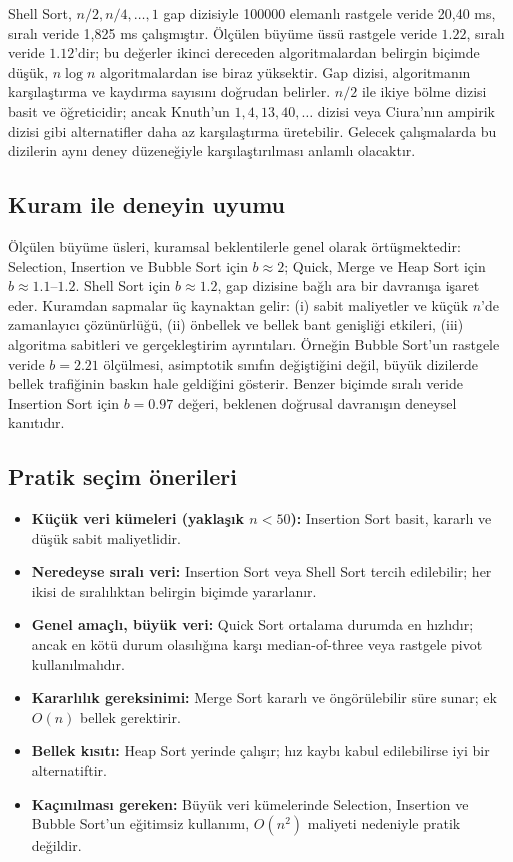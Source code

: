 \documentclass[12pt,a4paper]{article}
\begin{document}
Shell Sort, $n/2, n/4, \dots, 1$ gap dizisiyle 100000 elemanlı rastgele veride
20,40 ms, sıralı veride 1,825 ms çalışmıştır. Ölçülen büyüme üssü rastgele veride
$1.22$, sıralı veride $1.12$'dir; bu değerler ikinci dereceden
algoritmalardan belirgin biçimde düşük, $n \log n$ algoritmalardan ise biraz
yüksektir. Gap dizisi, algoritmanın karşılaştırma ve kaydırma sayısını doğrudan
belirler. $n/2$ ile ikiye bölme dizisi basit ve öğreticidir; ancak Knuth'un
$1, 4, 13, 40, \dots$ dizisi veya Ciura'nın ampirik dizisi gibi alternatifler
daha az karşılaştırma üretebilir. Gelecek çalışmalarda bu dizilerin aynı deney
düzeneğiyle karşılaştırılması anlamlı olacaktır.

\subsection{Kuram ile deneyin uyumu}

Ölçülen büyüme üsleri, kuramsal beklentilerle genel olarak örtüşmektedir:
Selection, Insertion ve Bubble Sort için $b \approx 2$; Quick, Merge ve Heap
Sort için $b \approx 1.1$--$1.2$. Shell Sort için $b \approx 1.2$, gap
dizisine bağlı ara bir davranışa işaret eder. Kuramdan sapmalar üç kaynaktan
gelir: (i) sabit maliyetler ve küçük $n$'de zamanlayıcı çözünürlüğü, (ii)
önbellek ve bellek bant genişliği etkileri, (iii) algoritma sabitleri ve
gerçekleştirim ayrıntıları. Örneğin Bubble Sort'un rastgele veride $b = 2.21$
ölçülmesi, asimptotik sınıfın değiştiğini değil, büyük dizilerde bellek
trafiğinin baskın hale geldiğini gösterir. Benzer biçimde sıralı veride Insertion
Sort için $b = 0.97$ değeri, beklenen doğrusal davranışın deneysel kanıtıdır.

\subsection{Pratik seçim önerileri}

\begin{itemize}
  \item \textbf{Küçük veri kümeleri (yaklaşık $n < 50$):} Insertion Sort basit,
        kararlı ve düşük sabit maliyetlidir.
  \item \textbf{Neredeyse sıralı veri:} Insertion Sort veya Shell Sort tercih
        edilebilir; her ikisi de sıralılıktan belirgin biçimde yararlanır.
  \item \textbf{Genel amaçlı, büyük veri:} Quick Sort ortalama durumda en
        hızlıdır; ancak en kötü durum olasılığına karşı median-of-three veya
        rastgele pivot kullanılmalıdır.
  \item \textbf{Kararlılık gereksinimi:} Merge Sort kararlı ve öngörülebilir
        süre sunar; ek $O(n)$ bellek gerektirir.
  \item \textbf{Bellek kısıtı:} Heap Sort yerinde çalışır; hız kaybı kabul
        edilebilirse iyi bir alternatiftir.
  \item \textbf{Kaçınılması gereken:} Büyük veri kümelerinde Selection,
        Insertion ve Bubble Sort'un eğitimsiz kullanımı, $O(n^2)$ maliyeti
        nedeniyle pratik değildir.
\end{itemize}
\end{document}
